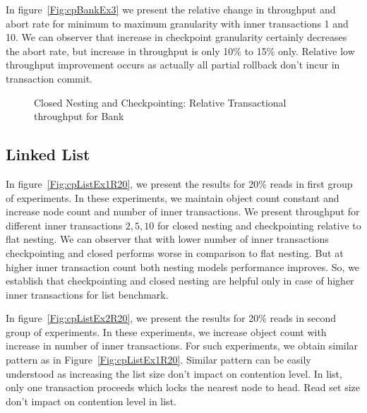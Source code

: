 \documentclass[12pt,english]{report}
\begin{document}
In figure~\ref{Fig:cpBankEx3} we present the relative change in throughput and abort rate for minimum to maximum granularity with inner transactions 1 and 10. We can observer that increase in checkpoint granularity certainly decreases the abort rate, but increase in throughput is only 10\% to 15\% only. Relative low throughput improvement occurs as actually all partial rollback don't incur in transaction commit.

\begin{figure}[H]
\centering
{}
\end{figure}
\begin{figure}[H]
\centering
{}
\end{figure}
\begin{figure}[H]
\centering
{}
\caption{Closed Nesting and Checkpointing: Relative Transactional throughput for Bank}
\label{Fig:cpBank}
\end{figure}

\subsection{Linked List}
In figure~\ref{Fig:cpListEx1R20}, we present the results for 20\% reads in first group of experiments. In these experiments, we maintain object count constant and increase node count and number of inner transactions. We present throughput for different inner transactions ${2, 5, 10}$ for closed nesting and checkpointing relative to flat nesting. We can observer that with lower number of inner transactions checkpointing and closed performs worse in comparison to flat nesting. But at higher inner transaction count both nesting models performance improves. So, we establish that checkpointing and closed nesting are helpful only in case of higher inner transactions for list benchmark.

In figure~\ref{Fig:cpListEx2R20}, we present the results for 20\% reads in second group of experiments. In these experiments, we increase object count with increase in number of inner transactions. For such experiments, we obtain similar pattern as in Figure~\ref{Fig:cpListEx1R20}. Similar pattern can be easily understood as increasing the list size don't impact on contention level. In list, only one transaction proceeds which locks the nearest node to head. Read set size don't impact on contention level in list.
\end{document}
